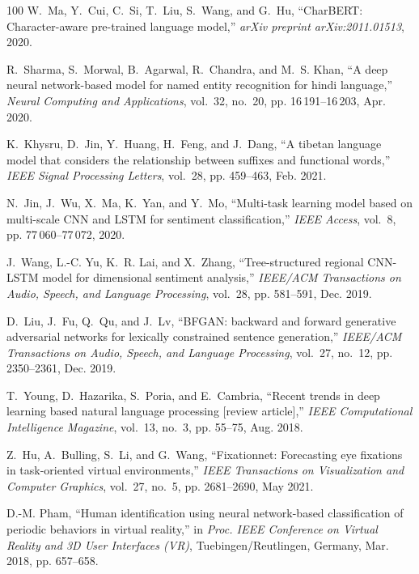 \documentclass[journal]{IEEEtran}
\begin{document}
\begin{thebibliography}{100}
	W.~Ma, Y.~Cui, C.~Si, T.~Liu, S.~Wang, and G.~Hu, ``{CharBERT}: Character-aware
	pre-trained language model,'' \emph{arXiv preprint arXiv:2011.01513}, 2020.
	
	R.~Sharma, S.~Morwal, B.~Agarwal, R.~Chandra, and M.~S. Khan, ``A deep neural
	network-based model for named entity recognition for hindi language,''
	\emph{Neural Computing and Applications}, vol.~32, no.~20, pp.
	16\,191--16\,203, Apr. 2020.
	
	K.~Khysru, D.~Jin, Y.~Huang, H.~Feng, and J.~Dang, ``A tibetan language model
	that considers the relationship between suffixes and functional words,''
	\emph{IEEE Signal Processing Letters}, vol.~28, pp. 459--463, Feb. 2021.
	
	N.~Jin, J.~Wu, X.~Ma, K.~Yan, and Y.~Mo, ``Multi-task learning model based on
	multi-scale {CNN and LSTM} for sentiment classification,'' \emph{IEEE
		Access}, vol.~8, pp. 77\,060--77\,072, 2020.
	
	J.~Wang, L.-C. Yu, K.~R. Lai, and X.~Zhang, ``Tree-structured regional
	{CNN-LSTM} model for dimensional sentiment analysis,'' \emph{IEEE/ACM
		Transactions on Audio, Speech, and Language Processing}, vol.~28, pp.
	581--591, Dec. 2019.
	
	D.~Liu, J.~Fu, Q.~Qu, and J.~Lv, ``{BFGAN}: backward and forward generative
	adversarial networks for lexically constrained sentence generation,''
	\emph{IEEE/ACM Transactions on Audio, Speech, and Language Processing},
	vol.~27, no.~12, pp. 2350--2361, Dec. 2019.
	
	T.~Young, D.~Hazarika, S.~Poria, and E.~Cambria, ``Recent trends in deep
	learning based natural language processing [review article],'' \emph{IEEE
		Computational Intelligence Magazine}, vol.~13, no.~3, pp. 55--75, Aug. 2018.
	
	Z.~Hu, A.~Bulling, S.~Li, and G.~Wang, ``{Fixationnet}: Forecasting eye
	fixations in task-oriented virtual environments,'' \emph{IEEE Transactions on
		Visualization and Computer Graphics}, vol.~27, no.~5, pp. 2681--2690, May
	2021.
	
	D.-M. Pham, ``Human identification using neural network-based classification of
	periodic behaviors in virtual reality,'' in \emph{Proc. IEEE Conference on
		Virtual Reality and 3D User Interfaces (VR)}, Tuebingen/Reutlingen, Germany,
	Mar. 2018, pp. 657--658.
	

\end{thebibliography}
\end{document}
